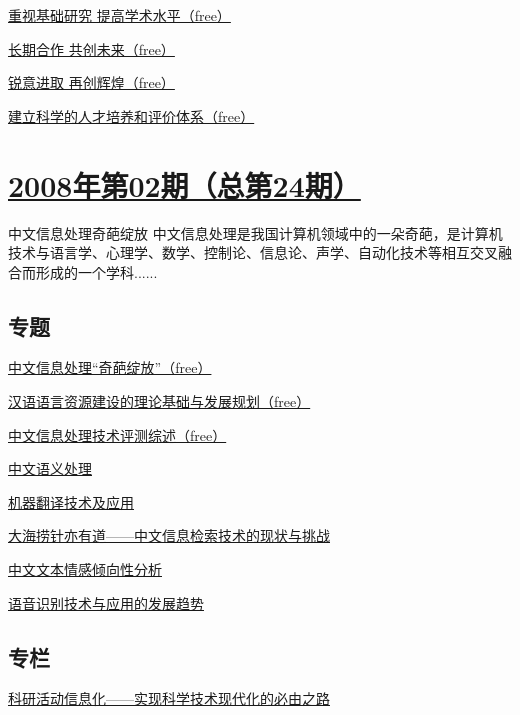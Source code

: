 \documentclass[a4paper]{article}
\begin{document}
\href{http://history.ccf.org.cn/resources/1190201776262/2010/04/15/025010.pdf}{重视基础研究  提高学术水平（free）}

\href{http://history.ccf.org.cn/resources/1190201776262/2010/04/15/025012.pdf}{长期合作  共创未来（free）}

\href{http://history.ccf.org.cn/resources/1190201776262/2010/04/15/025013.pdf}{锐意进取  再创辉煌（free）}

\href{http://history.ccf.org.cn/resources/1190201776262/2010/04/15/025014.pdf}{建立科学的人才培养和评价体系（free）}


\section{\href{http://history.ccf.org.cn/sites/ccf/jsjtbbd.jsp?contentId=2542567628989}{\textbf{2008年第02期（总第24期）}}}
中文信息处理奇葩绽放 中文信息处理是我国计算机领域中的一朵奇葩，是计算机技术与语言学、心理学、数学、控制论、信息论、声学、自动化技术等相互交叉融合而形成的一个学科......
\subsection{专题}
\href{http://history.ccf.org.cn/resources/1190201776262/2010/04/15/024012.pdf}{中文信息处理“奇葩绽放”（free）}

\href{http://history.ccf.org.cn/resources/1190201776262/2010/04/15/024015.pdf}{汉语语言资源建设的理论基础与发展规划（free）}

\href{http://history.ccf.org.cn/resources/1190201776262/2010/04/15/024021.pdf}{中文信息处理技术评测综述（free）}

\href{http://history.ccf.org.cn/resources/1190201776262/2010/04/15/024029.pdf}{中文语义处理}

\href{http://history.ccf.org.cn/resources/1190201776262/2010/04/15/024036.pdf}{机器翻译技术及应用}

\href{http://history.ccf.org.cn/resources/1190201776262/2010/04/15/024042.pdf}{大海捞针亦有道——中文信息检索技术的现状与挑战}

\href{http://history.ccf.org.cn/resources/1190201776262/2010/04/15/024047.pdf}{中文文本情感倾向性分析}

\href{http://history.ccf.org.cn/resources/1190201776262/2010/04/15/024054.pdf}{语音识别技术与应用的发展趋势}

\subsection{专栏}
\href{http://history.ccf.org.cn/resources/1190201776262/2010/04/15/024070.pdf}{科研活动信息化——实现科学技术现代化的必由之路}
\end{document}
